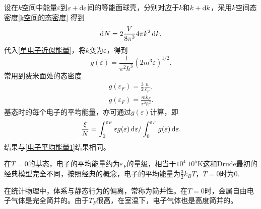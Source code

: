         设在$k$空间中能量$\varepsilon$到$\varepsilon+\mathop{}\!\mathrm{d}\varepsilon$间的等能面球壳，分别对应于$k$和$k+\mathop{}\!\mathrm{d} k$，采用$k$空间态密度\autoref{k空间的态密度}
        得到
        \begin{equation}
            \mathop{}\!\mathrm{d} N=2\frac{V}{8\pi^3}4\pi k^2\mathop{}\!\mathrm{d} k,
        \end{equation}
        代入\autoref{单电子近似能量}，将$k$变为$\varepsilon$，得到
        \begin{equation}
            g(\varepsilon)=\frac{1}{\pi^2\hbar^3}(2m^3\varepsilon)^{1/2}\label{电子态数与能量关系}.
        \end{equation}
        常用到费米面处的态密度
        \begin{align}
            g(\varepsilon_F)=\frac{3}{2}\frac{n}{\varepsilon_F}\label{费米面处的态密度1},\\
            g(\varepsilon_F)=\frac{mk_F}{\pi^2\hbar^2}\label{费米面处的态密度2}.
        \end{align}
        基态时的每个电子的平均能量，亦可通过$g(\varepsilon)$计算，即
        \begin{equation}
            \frac{\xi}{N}=\int_0^{\varepsilon_F}\varepsilon g(\varepsilon)\mathop{}\!\mathrm{d}\varepsilon/\int_0^{\varepsilon_F}g(\varepsilon)\mathop{}\!\mathrm{d} \varepsilon.
        \end{equation}
        结果与\autoref{电子平均能量1}结果相同。

        在$T=0$的基态，电子的平均能量约为$\varepsilon_F$的量级，相当于$10^4~10^5\mathrm{K}$这和Drude最初的经典模型完全不同，按照经典的概念，电子的平均能量为$\frac{3}{2}k_BT$，$T=0$时为0.

        在统计物理中，体系与静态行为的偏离，常称为简并性。在$T=0$时，金属自由电子气体是完全简并的。由于$T_F$很高，在室温下，电子气体也是高度简并的。
            
        
